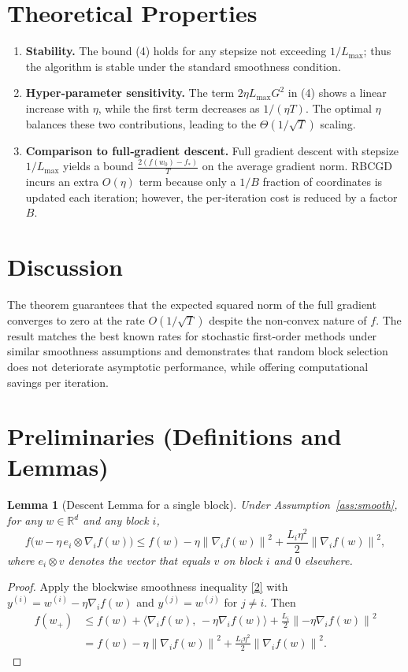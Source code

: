 \documentclass{article}
\newtheorem{lemma}{Lemma}
\newcommand{\R}{\mathbb{R}}
\newcommand{\norm}[1]{\left\lVert#1\right\rVert}
\begin{document}
\section*{Theoretical Properties}
\begin{enumerate}[label=\arabic*.]
\item \textbf{Stability.} The bound (4) holds for any stepsize not exceeding $1/L_{\max}$; thus the algorithm is stable under the standard smoothness condition.
\item \textbf{Hyper‑parameter sensitivity.} The term $2\eta L_{\max} G^{2}$ in (4) shows a linear increase with $\eta$, while the first term decreases as $1/(\eta T)$. The optimal $\eta$ balances these two contributions, leading to the $\Theta(1/\sqrt{T})$ scaling.
\item \textbf{Comparison to full‑gradient descent.} Full gradient descent with stepsize $1/L_{\max}$ yields a bound $ \frac{2(f(w_0)-f_*)}{T}$ on the average gradient norm. RBCGD incurs an extra $O(\eta)$ term because only a $1/B$ fraction of coordinates is updated each iteration; however, the per‑iteration cost is reduced by a factor $B$.
\end{enumerate}

\section*{Discussion}
The theorem guarantees that the expected squared norm of the full gradient converges to zero at the rate $O(1/\sqrt{T})$ despite the non‑convex nature of $f$. The result matches the best known rates for stochastic first‑order methods under similar smoothness assumptions and demonstrates that random block selection does not deteriorate asymptotic performance, while offering computational savings per iteration.

\newpage
\section*{Preliminaries (Definitions and Lemmas)}
\begin{lemma}[Descent Lemma for a single block]\label{lem:descent}
Under Assumption~\ref{ass:smooth}, for any $w\in\R^{d}$ and any block $i$,
\[
f\big(w - \eta \,e_i\otimes \nabla_i f(w)\big)
\le 
f(w) -\eta \norm{\nabla_i f(w)}^{2}
+\frac{L_i\eta^{2}}{2}\norm{\nabla_i f(w)}^{2},
\tag{5}
\]
where $e_i\otimes v$ denotes the vector that equals $v$ on block $i$ and $0$ elsewhere.
\end{lemma}
\begin{proof}
Apply the blockwise smoothness inequality \eqref{2} with
$y^{(i)} = w^{(i)} - \eta \nabla_i f(w)$ and $y^{(j)}=w^{(j)}$ for $j\neq i$.
Then
\[
\begin{aligned}
f(w_{+}) 
&\le f(w) + \big\langle \nabla_i f(w),\, -\eta \nabla_i f(w)\big\rangle
+ \frac{L_i}{2}\norm{-\eta \nabla_i f(w)}^{2}\\
&= f(w) -\eta \norm{\nabla_i f(w)}^{2}
+\frac{L_i\eta^{2}}{2}\norm{\nabla_i f(w)}^{2}.
\end{aligned}
\]
\end{proof}
\end{document}
